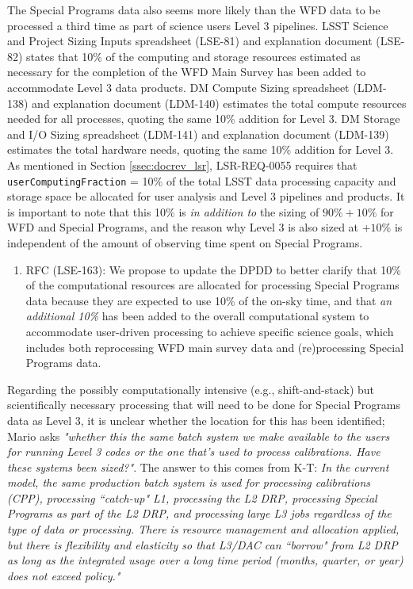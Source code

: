 \documentclass[DM,lsstdraft,toc]{lsstdoc}
\begin{document}
The Special Programs data also seems more likely than the WFD data to be processed a third time as part of science users Level 3 pipelines. LSST Science and Project Sizing Inputs spreadsheet (LSE-81) and explanation document (LSE-82) states that 10\% of the computing and storage resources estimated as necessary for the completion of the WFD Main Survey has been added to accommodate Level 3 data products. DM Compute Sizing spreadsheet (LDM-138) and explanation document (LDM-140) estimates the total compute resources needed for all processes, quoting the same 10\% addition for Level 3. DM Storage and I/O Sizing spreadsheet (LDM-141) and explanation document (LDM-139) estimates the total hardware needs, quoting the same 10\% addition for Level 3. As mentioned in Section \ref{ssec:docrev_lsr}, LSR-REQ-0055 requires that \texttt{userComputingFraction} = 10\% of the total LSST data processing capacity and storage space be allocated for user analysis and Level 3 pipelines and products. It is important to note that this 10\% is \textit{in addition to} the sizing of $90\%+10\%$ for WFD and Special Programs, and the reason why Level 3 is also sized at $+10\%$ is independent of the amount of observing time spent on Special Programs.

\begin{enumerate}[resume,topsep=-10pt,label= \textbf{Action \Roman*}] \item \label{Size-1} RFC (LSE-163): We propose to update the DPDD to better clarify that 10\% of the computational resources are allocated for processing Special Programs data because they are expected to use 10\% of the on-sky time, and that \textit{an additional 10\%} has been added to the overall computational system to accommodate user-driven processing to achieve specific science goals, which includes both reprocessing WFD main survey data and (re)processing Special Programs data. \end{enumerate}

Regarding the possibly computationally intensive (e.g., shift-and-stack) but scientifically necessary processing that will need to be done for Special Programs data as Level 3, it is unclear whether the location for this has been identified; Mario asks \textit{"whether this the same batch system we make available to the users for running Level 3 codes or the one that's used to process calibrations. Have these systems been sized?"}. The answer to this comes from K-T: \textit{In the current model, the same production batch system is used for processing calibrations (CPP), processing ``catch-up" L1, processing the L2 DRP, processing Special Programs as part of the L2 DRP, and processing large L3 jobs regardless of the type of data or processing. There is resource management and allocation applied, but there is flexibility and elasticity so that L3/DAC can ``borrow" from L2 DRP as long as the integrated usage over a long time period (months, quarter, or year) does not exceed policy."}
\end{document}

